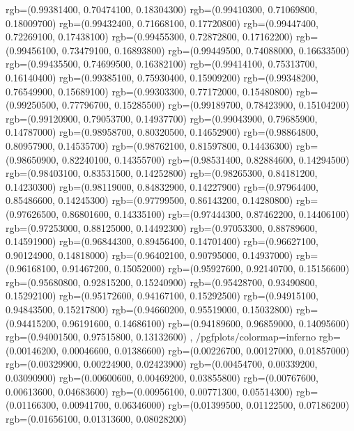 {{        rgb=(0.99381400, 0.70474100, 0.18304300)
        rgb=(0.99410300, 0.71069800, 0.18009700)
        rgb=(0.99432400, 0.71668100, 0.17720800)
        rgb=(0.99447400, 0.72269100, 0.17438100)
        rgb=(0.99455300, 0.72872800, 0.17162200)
        rgb=(0.99456100, 0.73479100, 0.16893800)
        rgb=(0.99449500, 0.74088000, 0.16633500)
        rgb=(0.99435500, 0.74699500, 0.16382100)
        rgb=(0.99414100, 0.75313700, 0.16140400)
        rgb=(0.99385100, 0.75930400, 0.15909200)
        rgb=(0.99348200, 0.76549900, 0.15689100)
        rgb=(0.99303300, 0.77172000, 0.15480800)
        rgb=(0.99250500, 0.77796700, 0.15285500)
        rgb=(0.99189700, 0.78423900, 0.15104200)
        rgb=(0.99120900, 0.79053700, 0.14937700)
        rgb=(0.99043900, 0.79685900, 0.14787000)
        rgb=(0.98958700, 0.80320500, 0.14652900)
        rgb=(0.98864800, 0.80957900, 0.14535700)
        rgb=(0.98762100, 0.81597800, 0.14436300)
        rgb=(0.98650900, 0.82240100, 0.14355700)
        rgb=(0.98531400, 0.82884600, 0.14294500)
        rgb=(0.98403100, 0.83531500, 0.14252800)
        rgb=(0.98265300, 0.84181200, 0.14230300)
        rgb=(0.98119000, 0.84832900, 0.14227900)
        rgb=(0.97964400, 0.85486600, 0.14245300)
        rgb=(0.97799500, 0.86143200, 0.14280800)
        rgb=(0.97626500, 0.86801600, 0.14335100)
        rgb=(0.97444300, 0.87462200, 0.14406100)
        rgb=(0.97253000, 0.88125000, 0.14492300)
        rgb=(0.97053300, 0.88789600, 0.14591900)
        rgb=(0.96844300, 0.89456400, 0.14701400)
        rgb=(0.96627100, 0.90124900, 0.14818000)
        rgb=(0.96402100, 0.90795000, 0.14937000)
        rgb=(0.96168100, 0.91467200, 0.15052000)
        rgb=(0.95927600, 0.92140700, 0.15156600)
        rgb=(0.95680800, 0.92815200, 0.15240900)
        rgb=(0.95428700, 0.93490800, 0.15292100)
        rgb=(0.95172600, 0.94167100, 0.15292500)
        rgb=(0.94915100, 0.94843500, 0.15217800)
        rgb=(0.94660200, 0.95519000, 0.15032800)
        rgb=(0.94415200, 0.96191600, 0.14686100)
        rgb=(0.94189600, 0.96859000, 0.14095600)
        rgb=(0.94001500, 0.97515800, 0.13132600)
    },
    /pgfplots/colormap={inferno}{
        rgb=(0.00146200, 0.00046600, 0.01386600)
        rgb=(0.00226700, 0.00127000, 0.01857000)
        rgb=(0.00329900, 0.00224900, 0.02423900)
        rgb=(0.00454700, 0.00339200, 0.03090900)
        rgb=(0.00600600, 0.00469200, 0.03855800)
        rgb=(0.00767600, 0.00613600, 0.04683600)
        rgb=(0.00956100, 0.00771300, 0.05514300)
        rgb=(0.01166300, 0.00941700, 0.06346000)
        rgb=(0.01399500, 0.01122500, 0.07186200)
        rgb=(0.01656100, 0.01313600, 0.08028200)
}}
